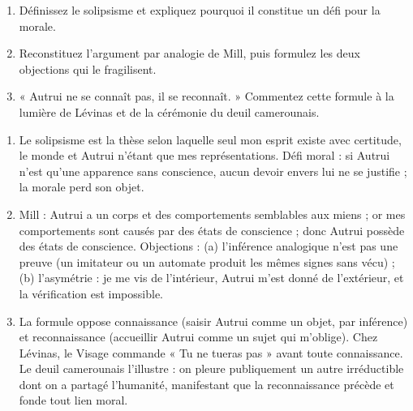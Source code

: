 \documentclass[11pt]{article}
\begin{document}
\begin{exercice}
\begin{enumerate}
\item Définissez le solipsisme et expliquez pourquoi il constitue un défi pour la morale.
\item Reconstituez l'argument par analogie de Mill, puis formulez les deux objections qui le fragilisent.
\item « Autrui ne se connaît pas, il se reconnaît. » Commentez cette formule à la lumière de Lévinas et de la cérémonie du deuil camerounais.
\end{enumerate}
\end{exercice}

\begin{corrige}[Exercice]
\begin{enumerate}
\item Le solipsisme est la thèse selon laquelle seul mon esprit existe avec certitude, le monde et Autrui n'étant que mes représentations. Défi moral : si Autrui n'est qu'une apparence sans conscience, aucun devoir envers lui ne se justifie ; la morale perd son objet.
\item Mill : Autrui a un corps et des comportements semblables aux miens ; or mes comportements sont causés par des états de conscience ; donc Autrui possède des états de conscience. Objections : (a) l'inférence analogique n'est pas une preuve (un imitateur ou un automate produit les mêmes signes sans vécu) ; (b) l'asymétrie : je me vis de l'intérieur, Autrui m'est donné de l'extérieur, et la vérification est impossible.
\item La formule oppose connaissance (saisir Autrui comme un objet, par inférence) et reconnaissance (accueillir Autrui comme un sujet qui m'oblige). Chez Lévinas, le Visage commande « Tu ne tueras pas » avant toute connaissance. Le deuil camerounais l'illustre : on pleure publiquement un autre irréductible dont on a partagé l'humanité, manifestant que la reconnaissance précède et fonde tout lien moral.
\end{enumerate}
\end{corrige}
\end{document}
